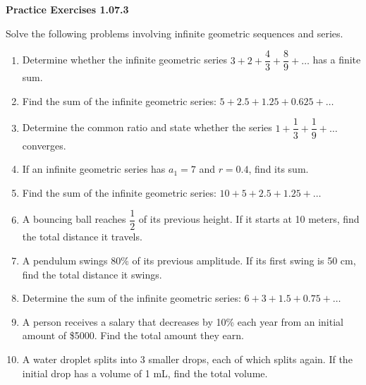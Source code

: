 \vspace{0.3ex}
\noindent\textbf{Practice Exercises 1.07.3}

\vspace{0.2ex}

Solve the following problems involving infinite geometric sequences and series.
\begin{enumerate}
    \item Determine whether the infinite geometric series \(3 + 2 + \dfrac{4}{3} + \dfrac{8}{9} + \dots\) has a finite sum.
    \item Find the sum of the infinite geometric series: \(5 + 2.5 + 1.25 + 0.625 + \dots\)
    \item Determine the common ratio and state whether the series \(1 + \dfrac{1}{3} + \dfrac{1}{9} + \dots\) converges.
    \item If an infinite geometric series has \(a_1 = 7\) and \(r = 0.4\), find its sum.
    \item Find the sum of the infinite geometric series: \(10 + 5 + 2.5 + 1.25 + \dots\)
    \item A bouncing ball reaches \(\dfrac{1}{2}\) of its previous height. If it starts at 10 meters, find the total distance it travels.
    \item A pendulum swings 80\% of its previous amplitude. If its first swing is 50 cm, find the total distance it swings.
    \item Determine the sum of the infinite geometric series: \(6 + 3 + 1.5 + 0.75 + \dots\)
    \item A person receives a salary that decreases by 10\% each year from an initial amount of \$5000. Find the total amount they earn.
    \item A water droplet splits into 3 smaller drops, each of which splits again. If the initial drop has a volume of 1 mL, find the total volume.
\end{enumerate}

